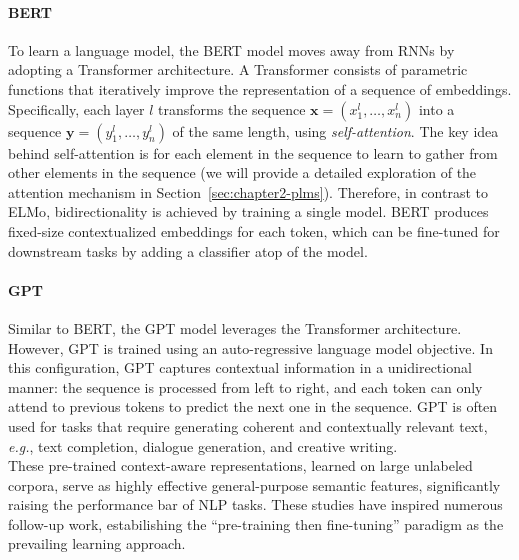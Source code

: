 \paragraph{BERT} To learn a language model, the \ac{BERT} model \citep{devlin2018bert} moves away from \acp{RNN} by adopting a Transformer \citep{vaswani2017attention} architecture. A Transformer consists of parametric functions that iteratively improve the representation of a sequence of embeddings. Specifically, each layer $l$ transforms the sequence $\bm{x} = (x^l_1, \ldots, x^l_n)$ into a sequence $\bm{y} = (y^l_1, \ldots, y^l_n)$ of the same length, using \textit{self-attention}. The key idea behind self-attention is for each element in the sequence to learn to gather from other elements in the sequence (we will provide a detailed exploration of the attention mechanism in Section~\ref{sec:chapter2-plms}). Therefore, in contrast to \ac{ELMo}, bidirectionality is achieved by training a single model. \ac{BERT} produces fixed-size contextualized embeddings for each token, which can be fine-tuned for downstream tasks by adding a classifier atop of the model.


\paragraph{GPT} Similar to \ac{BERT}, the \ac{GPT} model \citep{radford2018improving} leverages the Transformer architecture. However, \ac{GPT} is trained using an auto-regressive language model objective. In this configuration, \ac{GPT} captures contextual information in a unidirectional manner: the sequence is processed from left to right, and each token can only attend to previous tokens to predict the next one in the sequence. \ac{GPT} is often used for tasks that require generating coherent and contextually relevant text, \textit{e.g.}, text completion, dialogue generation, and creative writing. \\

These pre-trained context-aware representations, learned on large unlabeled corpora, serve as highly effective general-purpose semantic features, significantly raising the performance bar of \ac{NLP} tasks. These studies have inspired numerous follow-up work, estabilishing the “pre-training then fine-tuning” paradigm as the prevailing learning approach. 

